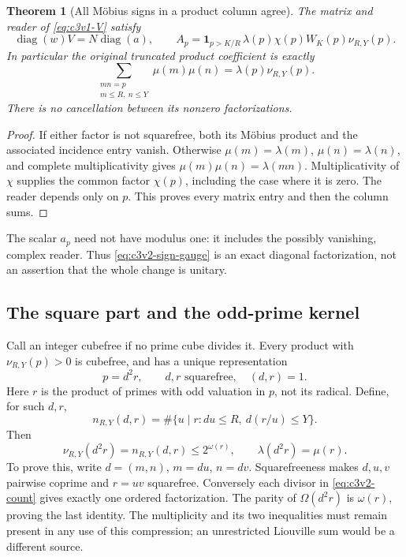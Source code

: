 \documentclass[11pt]{article}
\newtheorem{theorem}{Theorem}[section]
\theoremstyle{remark}
\begin{document}
\begin{theorem}[All M\"obius signs in a product column agree]
\label{thm:c3v2-column-sign}
The matrix and reader of \eqref{eq:c3v1-V} satisfy
\begin{equation}
 \operatorname{diag}(w)V=N\operatorname{diag}(a),\qquad
 A_p=\mathbf1_{p>K/R}\,
             \lambda(p)\chi(p)W_K(p)\nu_{R,Y}(p).
 \label{eq:c3v2-sign-gauge}
\end{equation}
In particular the original truncated product coefficient is exactly
\begin{equation}
 \sum_{\substack{mn=p\\m\le R,\ n\le Y}}\mu(m)\mu(n)
                        =\lambda(p)\nu_{R,Y}(p).
 \label{eq:c3v2-beta}
\end{equation}
There is no cancellation between its nonzero factorizations.
\end{theorem}

\begin{proof}
If either factor is not squarefree, both its M\"obius product and
the associated incidence entry vanish.  Otherwise
\(\mu(m)=\lambda(m)\), \(\mu(n)=\lambda(n)\), and complete
multiplicativity gives \(\mu(m)\mu(n)=\lambda(mn)\).
Multiplicativity of \(\chi\) supplies the common factor \(\chi(p)\),
including the case where it is zero.  The reader depends only on
\(p\).  This proves every matrix entry and then the column sums.
\end{proof}

The scalar \(a_p\) need not have modulus one: it includes the
possibly vanishing, complex reader.  Thus \eqref{eq:c3v2-sign-gauge}
is an exact diagonal factorization, not an assertion that the whole
change is unitary.

\subsection{The square part and the odd-prime kernel}

Call an integer cubefree if no prime cube divides it.  Every product
with \(\nu_{R,Y}(p)>0\) is cubefree, and has a unique representation
\begin{equation}
 p=d^2r,\qquad d,r\text{ squarefree},\quad(d,r)=1.
 \label{eq:c3v2-kernel}
\end{equation}
Here \(r\) is the product of primes with odd valuation in \(p\),
not its radical.  Define, for such \(d,r\),
\begin{equation}
 n_{R,Y}(d,r)=\#\{u\mid r:du\le R,\ d(r/u)\le Y\}.
 \label{eq:c3v2-count}
\end{equation}
Then
\begin{equation}
 \nu_{R,Y}(d^2r)=n_{R,Y}(d,r)\le2^{\omega(r)},\qquad
                         \lambda(d^2r)=\mu(r).
 \label{eq:c3v2-kernel-count}
\end{equation}
To prove this, write \(d=(m,n)\), \(m=du\), \(n=dv\).
Squarefreeness makes \(d,u,v\) pairwise coprime and \(r=uv\)
squarefree.  Conversely each divisor in \eqref{eq:c3v2-count}
gives exactly one ordered factorization.  The parity of
\(\Omega(d^2r)\) is \(\omega(r)\), proving the last identity.
The multiplicity and its two inequalities must remain present in
any use of this compression; an unrestricted Liouville sum would
be a different source.
\end{document}
